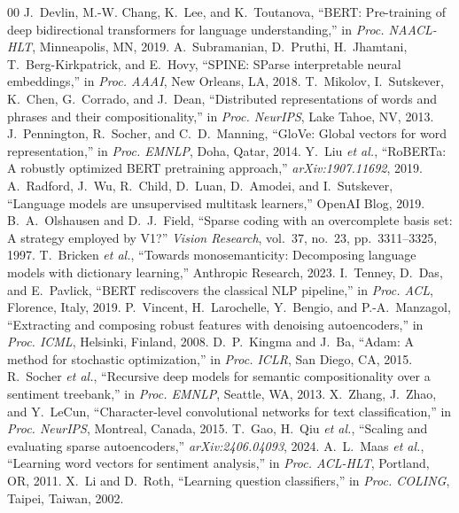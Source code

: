 \documentclass[conference]{IEEEtran}
\begin{document}
\begin{thebibliography}{00}
 J.~Devlin, M.-W. Chang, K.~Lee, and K.~Toutanova,
``BERT: Pre-training of deep bidirectional transformers for language
understanding,'' in \emph{Proc. NAACL-HLT}, Minneapolis, MN, 2019.
 A.~Subramanian, D.~Pruthi, H.~Jhamtani,
T.~Berg-Kirkpatrick, and E.~Hovy, ``SPINE: SParse interpretable neural
embeddings,'' in \emph{Proc. AAAI}, New Orleans, LA, 2018.
 T.~Mikolov, I.~Sutskever, K.~Chen,
G.~Corrado, and J.~Dean, ``Distributed representations of words and phrases
and their compositionality,'' in \emph{Proc. NeurIPS}, Lake Tahoe, NV, 2013.
 J.~Pennington, R.~Socher, and C.~D.~Manning,
``GloVe: Global vectors for word representation,'' in \emph{Proc. EMNLP},
Doha, Qatar, 2014.
 Y.~Liu \emph{et al.}, ``RoBERTa: A robustly
optimized BERT pretraining approach,'' \emph{arXiv:1907.11692}, 2019.
 A.~Radford, J.~Wu, R.~Child, D.~Luan,
D.~Amodei, and I.~Sutskever, ``Language models are unsupervised multitask
learners,'' OpenAI Blog, 2019.
 B.~A.~Olshausen and D.~J.~Field, ``Sparse
coding with an overcomplete basis set: A strategy employed by V1?''
\emph{Vision Research}, vol.~37, no.~23, pp.\ 3311--3325, 1997.
 T.~Bricken \emph{et al.}, ``Towards
monosemanticity: Decomposing language models with dictionary learning,''
Anthropic Research, 2023.
 I.~Tenney, D.~Das, and E.~Pavlick, ``BERT
rediscovers the classical NLP pipeline,'' in \emph{Proc. ACL}, Florence,
Italy, 2019.
 P.~Vincent, H.~Larochelle, Y.~Bengio, and
P.-A.~Manzagol, ``Extracting and composing robust features with denoising
autoencoders,'' in \emph{Proc. ICML}, Helsinki, Finland, 2008.
 D.~P.~Kingma and J.~Ba, ``Adam: A method for
stochastic optimization,'' in \emph{Proc. ICLR}, San Diego, CA, 2015.
 R.~Socher \emph{et al.}, ``Recursive deep
models for semantic compositionality over a sentiment treebank,'' in
\emph{Proc. EMNLP}, Seattle, WA, 2013.
 X.~Zhang, J.~Zhao, and Y.~LeCun,
``Character-level convolutional networks for text classification,'' in
\emph{Proc. NeurIPS}, Montreal, Canada, 2015.
 T.~Gao, H.~Qiu \emph{et al.}, ``Scaling and
evaluating sparse autoencoders,'' \emph{arXiv:2406.04093}, 2024.
 A.~L.~Maas \emph{et al.}, ``Learning word vectors
for sentiment analysis,'' in \emph{Proc. ACL-HLT}, Portland, OR, 2011.
 X.~Li and D.~Roth, ``Learning question classifiers,''
in \emph{Proc. COLING}, Taipei, Taiwan, 2002.
\end{thebibliography}
\end{document}
